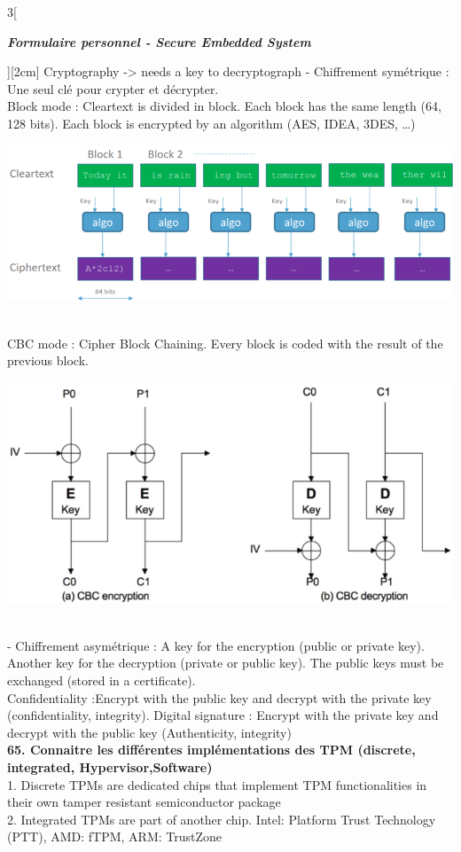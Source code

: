 \begin{multicols}{3}[\centerline{ \large\em \textbf{Formulaire personnel - Secure Embedded System}}][2cm]
Cryptography -> needs a key to decryptograph
- Chiffrement symétrique : Une seul clé pour crypter et décrypter. \\
Block mode : Cleartext is divided in block. Each block has the same length (64, 128 bits). Each block is encrypted by an algorithm (AES, IDEA, 3DES, …)\\
\begin{minipage}{\linewidth}
	\centering
    \includegraphics[width =0.6\columnwidth]{images/45.png}
\end{minipage}\\
CBC mode : Cipher Block Chaining. Every block is coded with the result of the previous block.\\
\begin{minipage}{\linewidth}
	\centering
    \includegraphics[width =0.6\columnwidth]{images/46.png}
\end{minipage}\\
- Chiffrement asymétrique : A key for the encryption (public or private key). Another key for the decryption (private or public key). The public keys must be exchanged (stored in a certificate).\\
Confidentiality :Encrypt with the public key and decrypt with the private key (confidentiality, integrity). Digital signature : Encrypt with the private key and decrypt with the public key (Authenticity, integrity)
\\ \textbf{65. Connaitre les différentes implémentations des TPM (discrete, integrated, Hypervisor,Software)\\}
1. Discrete TPMs are dedicated chips that implement TPM functionalities in their own tamper resistant semiconductor package\\
2. Integrated TPMs are part of another chip. Intel: Platform Trust Technology (PTT), AMD: fTPM, ARM: TrustZone\\

\end{multicols}
